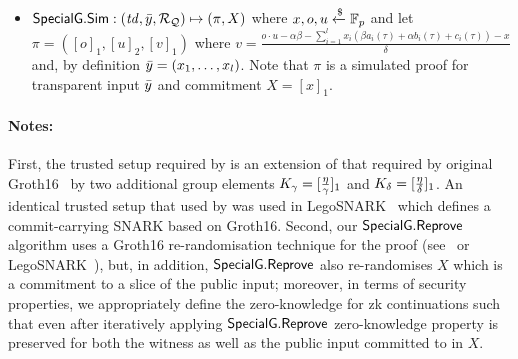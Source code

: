 \begin{definition}
\begin{itemize}
\item ${\mathsf{SpecialG}}.{\mathsf{Sim}}: (\mathit{td}, \bar{y}, \mathcal{R}_{\mathcal{Q}}) \mapsto (\pi, X)$ where $x, o, u \xleftarrow {\$} \mathbb{F}_p$ and let \\
$\pi = ([o]_1, [u]_2, [v]_1)$ where $v = \frac{o\cdot u - \alpha \beta - \sum_{i=1}^{l} x_i (\beta a_i(\tau)+ \alpha b_i(\tau)+ c_i(\tau))- x}{\delta}  $ and, 
by definition $\bar{y} = (x_1, \ldots, x_l)$. Note that $\pi$ is a simulated proof for transparent input $\bar{y}$ and commitment $X = [x]_1$.
\end{itemize} 
\end{definition}

\noindent \paragraph{Notes:} First, the trusted setup required by \SpecialG is 
an extension of that required by original Groth16~\cite{Groth16} by two additional 
group elements $K_{\gamma} = [\frac{\eta}{\gamma}]_1$ and $K_{\delta} = [\frac{\eta}{\delta}]_1$. 
An identical trusted setup  that used by \SpecialG was used in LegoSNARK~\cite[Fig.~22]{LegoSNARK} which defines 
a commit-carrying SNARK based on Groth16. Second, our ${\mathsf{SpecialG}}.{\mathsf{Reprove}}$ algorithm uses a Groth16 re-randomisation 
technique for the proof (see~\cite[Fig.~1]{RandomizationGroth16} or LegoSNARK~\cite[Fig.~22]{LegoSNARK}), 
but, in addition, ${\mathsf{SpecialG}}.{\mathsf{Reprove}}$ also re-randomises $X$ which is a commitment to a slice of the public input; moreover, in terms of security 
properties, we appropriately define the zero-knowledge for zk continuations such that even after iteratively applying 
${\mathsf{SpecialG}}.{\mathsf{Reprove}}$ zero-knowledge property is preserved for both the witness as well as the public input committed to in $X$.  \\


